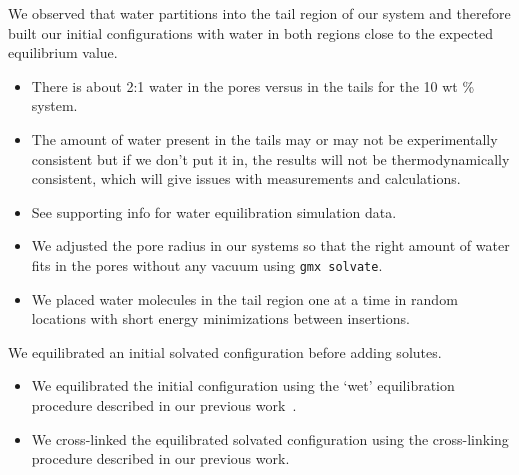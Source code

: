 \documentclass{article}
\begin{document}
  We observed that water partitions into the tail region of our system and therefore
  built our initial configurations with water in both regions close to the expected
  equilibrium value.
  \begin{itemize}
	\item There is about 2:1 water in the pores versus in the tails for the 10 wt \% system.
	\item The amount of water present in the tails may or may not be experimentally consistent
	but if we don't put it in, the results will not be thermodynamically consistent, which 
	will give issues with measurements and calculations.
	\item See supporting info for water equilibration simulation data.
	\item We adjusted the pore radius in our systems so that the right amount of water
	fits in the pores without any vacuum using \texttt{gmx solvate}.
	\item We placed water molecules in the tail region one at a time in random locations
	with short energy minimizations between insertions.
  \end{itemize}



  We equilibrated an initial solvated configuration before adding solutes.
  \begin{itemize}
	\item We equilibrated the initial configuration using the `wet'
	equilibration procedure described in our previous work~\cite{coscia_understanding_2019}.
	\item We cross-linked the equilibrated solvated configuration using the
	cross-linking procedure described in our previous work. 
  \end{itemize}
\end{document}
